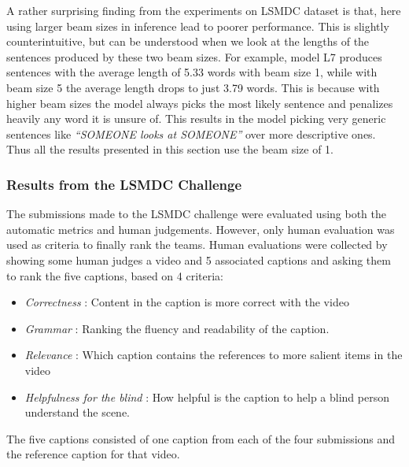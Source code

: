 A rather surprising finding from the experiments on LSMDC dataset is that, here
using larger beam sizes in inference lead to poorer performance.
This is slightly counterintuitive, but can be understood when we look at the
lengths of the sentences produced by these two beam sizes. 
For example, model L7 produces sentences with the average length
of 5.33 words with beam size 1, while with beam size 5 the average length drops
to just 3.79 words. This is because with higher beam sizes the model always
picks the most likely sentence and penalizes heavily any word it is unsure of.
This results in the model picking very generic sentences like \emph{``SOMEONE
looks at SOMEONE''} over more descriptive ones.
Thus all the results presented in this section use the beam size of 1.

\subsubsection{Results from the LSMDC Challenge}
\label{subsec:LSMDCChall}
The submissions made to the LSMDC challenge were evaluated using both the
automatic metrics and human judgements.
However, only human evaluation was used as criteria to finally rank the teams.
Human evaluations were collected by showing some human judges a video and 5
associated captions and asking them to rank the five captions, based on 4
criteria:
\begin{itemize}
  \item \emph{Correctness} : Content in the caption is more correct with the video 
  \item \emph{Grammar} : Ranking the fluency and readability of the caption. 
  \item \emph{Relevance} : Which caption contains the references to more salient items in the video
  \item \emph{Helpfulness for the blind} : How helpful is the caption to help a
          blind person understand the scene.
\end{itemize}
The five captions consisted of one caption from each of the four submissions and
the reference caption for that video.

